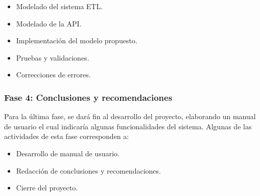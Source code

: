 \begin{itemize}
    \item Modelado del sistema ETL.
    \item Modelado de la API.
    \item Implementación del modelo propuesto.
    \item Pruebas y validaciones.
    \item Correcciones de errores.
\end{itemize}

\subsubsection{Fase 4: Conclusiones y recomendaciones}
Para la última fase, se dará fin al desarrollo del proyecto, elaborando un manual de usuario el cual indicaría algunas funcionalidades del sistema. Algunas de las actividades de esta fase corresponden a:

\begin{itemize}
    \item Desarrollo de manual de usuario.
    \item Redacción de conclusiones y recomendaciones.
    \item Cierre del proyecto.
\end{itemize}
